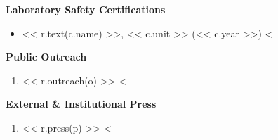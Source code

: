 \documentclass[11pt]{article}
\begin{document}
{\large\textbf{Laboratory Safety Certifications}}

\begin{itemize}[leftmargin=*,nosep]
<%
    \item << r.text(c.name) >>, << c.unit >> (<< c.year >>)
<%
\end{itemize}

{\large\textbf{Public Outreach}}

\begin{enumerate}[leftmargin=*,nosep]
<%
    \item << r.outreach(o) >>
<%
\end{enumerate}

\medskip

{\Large\textbf{External \& Institutional Press}}

\begin{enumerate}[leftmargin=*,nosep]
<%
    \item << r.press(p) >>
<%
\end{enumerate}
\end{document}
